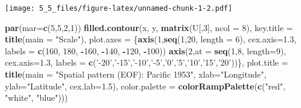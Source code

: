 \documentclass[]{article}
\newenvironment{Shaded}{\begin{snugshade}}{\end{snugshade}}
\newcommand{\KeywordTok}[1]{\textcolor[rgb]{0.13,0.29,0.53}{\textbf{#1}}}
\newcommand{\DataTypeTok}[1]{\textcolor[rgb]{0.13,0.29,0.53}{#1}}
\newcommand{\DecValTok}[1]{\textcolor[rgb]{0.00,0.00,0.81}{#1}}
\newcommand{\FloatTok}[1]{\textcolor[rgb]{0.00,0.00,0.81}{#1}}
\newcommand{\StringTok}[1]{\textcolor[rgb]{0.31,0.60,0.02}{#1}}
\newcommand{\OperatorTok}[1]{\textcolor[rgb]{0.81,0.36,0.00}{\textbf{#1}}}
\newcommand{\NormalTok}[1]{#1}
\begin{document}
\texttt{[image: 5\_5\_files/figure-latex/unnamed-chunk-1-2.pdf]}

\begin{Shaded}
\begin{Highlighting}[]
\KeywordTok{par}\NormalTok{(}\DataTypeTok{mar=}\KeywordTok{c}\NormalTok{(}\DecValTok{5}\NormalTok{,}\DecValTok{5}\NormalTok{,}\DecValTok{2}\NormalTok{,}\DecValTok{1}\NormalTok{))}
\KeywordTok{filled.contour}\NormalTok{(x, y, }\KeywordTok{matrix}\NormalTok{(U[,}\DecValTok{3}\NormalTok{], }\DataTypeTok{ncol =} \DecValTok{8}\NormalTok{), }
               \DataTypeTok{key.title =} \KeywordTok{title}\NormalTok{(}\DataTypeTok{main =} \StringTok{"Scale"}\NormalTok{),}
               \DataTypeTok{plot.axes =}\NormalTok{  \{}\KeywordTok{axis}\NormalTok{(}\DecValTok{1}\NormalTok{,}\KeywordTok{seq}\NormalTok{(}\DecValTok{1}\NormalTok{,}\DecValTok{20}\NormalTok{, }\DataTypeTok{length =} \DecValTok{6}\NormalTok{), }\DataTypeTok{cex.axis=}\FloatTok{1.3}\NormalTok{, }\DataTypeTok{labels =} \KeywordTok{c}\NormalTok{(}\DecValTok{160}\NormalTok{, }\DecValTok{180}\NormalTok{, }\OperatorTok{-}\DecValTok{160}\NormalTok{, }\OperatorTok{-}\DecValTok{140}\NormalTok{, }\OperatorTok{-}\DecValTok{120}\NormalTok{, }\OperatorTok{-}\DecValTok{100}\NormalTok{))  }
                 \KeywordTok{axis}\NormalTok{(}\DecValTok{2}\NormalTok{,}\DataTypeTok{at =} \KeywordTok{seq}\NormalTok{(}\DecValTok{1}\NormalTok{,}\DecValTok{8}\NormalTok{, }\DataTypeTok{length=}\DecValTok{9}\NormalTok{), }\DataTypeTok{cex.axis=}\FloatTok{1.3}\NormalTok{, }\DataTypeTok{labels =} \KeywordTok{c}\NormalTok{(}\StringTok{'-20'}\NormalTok{,}\StringTok{'-15'}\NormalTok{,}\StringTok{'-10'}\NormalTok{,}\StringTok{'-5'}\NormalTok{,}\StringTok{'0'}\NormalTok{,}\StringTok{'5'}\NormalTok{,}\StringTok{'10'}\NormalTok{,}\StringTok{'15'}\NormalTok{,}\StringTok{'20'}\NormalTok{))\},}
               \DataTypeTok{plot.title =} \KeywordTok{title}\NormalTok{(}\DataTypeTok{main =} \StringTok{"Spatial pattern (EOF): Pacific 1953"}\NormalTok{,}
                                  \DataTypeTok{xlab=}\StringTok{"Longitude"}\NormalTok{,}
                                  \DataTypeTok{ylab=}\StringTok{"Latitude"}\NormalTok{, }\DataTypeTok{cex.lab=}\FloatTok{1.5}\NormalTok{),}
               \DataTypeTok{color.palette =} \KeywordTok{colorRampPalette}\NormalTok{(}\KeywordTok{c}\NormalTok{(}\StringTok{"red"}\NormalTok{, }\StringTok{"white"}\NormalTok{, }\StringTok{"blue"}\NormalTok{)))}
\end{Highlighting}
\end{Shaded}
\end{document}
